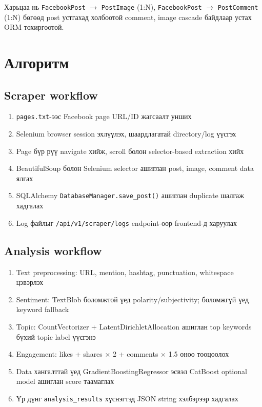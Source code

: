 \documentclass[
12pt,
oneside,
english,
onehalfspacing,
nolistspacing,
headsepline,
]{MUST-Thesis}
\begin{document}
Харьцаа нь \texttt{FacebookPost} $\rightarrow$ \texttt{PostImage} (1:N), \texttt{FacebookPost} $\rightarrow$ \texttt{PostComment} (1:N) бөгөөд post устгахад холбоотой comment, image cascade байдлаар устах ORM тохиргоотой.

\section{Алгоритм}

\subsection{Scraper workflow}
\begin{enumerate}
    \item \texttt{pages.txt}-ээс Facebook page URL/ID жагсаалт унших
    \item Selenium browser session эхлүүлэх, шаардлагатай directory/log үүсгэх
    \item Page бүр рүү navigate хийж, scroll болон selector-based extraction хийх
    \item BeautifulSoup болон Selenium selector ашиглан post, image, comment data ялгах
    \item SQLAlchemy \texttt{DatabaseManager.save\_post()} ашиглан duplicate шалгаж хадгалах
    \item Log файлыг \texttt{/api/v1/scraper/logs} endpoint-оор frontend-д харуулах
\end{enumerate}

\subsection{Analysis workflow}
\begin{enumerate}
    \item Text preprocessing: URL, mention, hashtag, punctuation, whitespace цэвэрлэх
    \item Sentiment: TextBlob боломжтой үед polarity/subjectivity; боломжгүй үед keyword fallback
    \item Topic: CountVectorizer + LatentDirichletAllocation ашиглан top keywords бүхий topic label үүсгэнэ
    \item Engagement: likes + shares $\times$ 2 + comments $\times$ 1.5 оноо тооцоолох
    \item Data хангалттай үед GradientBoostingRegressor эсвэл CatBoost optional model ашиглан score таамаглах
    \item Үр дүнг \texttt{analysis\_results} хүснэгтэд JSON string хэлбэрээр хадгалах
\end{enumerate}
\end{document}
